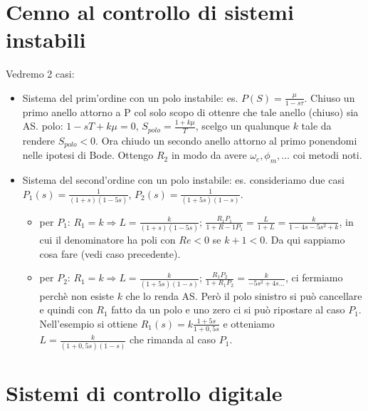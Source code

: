 \begin{landscape}
\begin{multicols*}{2}
    \section{Cenno al controllo di sistemi instabili}
    Vedremo 2 casi:
    \begin{itemize}
        \item Sistema del prim'ordine con un polo instabile: es. $P(S) = \frac{\mu}{1-s \tau}$.\newline
        Chiuso un primo anello attorno a P col solo scopo di ottenre che tale anello (chiuso) sia AS.\newline
        polo: $1-s T + k \mu = 0$, $S_{polo} = \frac{1 + k \mu}{T}$, scelgo un qualunque $k$ tale da rendere $S_{polo} < 0$. Ora chiudo un secondo anello attorno al primo ponendomi nelle ipotesi di Bode. Ottengo $R_2$ in modo da avere $\omega_c, \phi_m, \dots$ coi metodi noti.
        \item Sistema del second'ordine con un polo instabile: es. consideriamo due casi $P_1(s) = \frac{1}{(1+s) (1-5s)}$, $P_2(s) = \frac{1}{(1+5s) ( 1-s)}$.\newline
        \begin{itemize}
            \item per $P_1$: $R_1 = k \Rightarrow L = \frac{k}{(1+s) (1-5s)}$; $\frac{R_1 P_1}{1+R-1P_1} =  \frac{L}{1+L} = \frac{k}{1-4s-5s^2 + k}$, in cui il denominatore ha poli con $Re<0$ se $k+1<0$. Da qui sappiamo cosa fare (vedi caso precedente).
            \item per $P_2$: $R_1 = k \Rightarrow L = \frac{k}{(1+5s) (1-s)}$; $\frac{R_1 P_2}{1+ R_1 P_2} = \frac{k}{-5s^2 + 4s \dots}$, ci fermiamo perchè non esiste $k$ che lo renda AS. Però il polo sinistro si può cancellare e quindi con $R_1$ fatto da un polo e uno zero ci si può ripostare al caso $P_1$. Nell'esempio si ottiene $R_1(s) = k \frac{1+5s}{1+0,5 s}$ e otteniamo $L = \frac{k}{(1+0,5 s) (1-s)}$ che rimanda al caso $P_1$. 
        \end{itemize}
    \end{itemize}
    \newpage\section{Sistemi di controllo digitale}

\end{multicols*}
\end{landscape}
